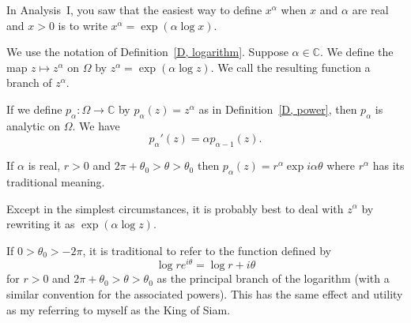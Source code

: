 In Analysis~I, you saw that the easiest way to
define $x^{\alpha}$ when $x$ and $\alpha$ are real
and $x>0$ is to write $x^{\alpha}=\exp(\alpha \log x)$.
\begin{definition}\label{D, power} 
We use the notation of
Definition~\ref{D, logarithm}. Suppose $\alpha\in{\mathbb C}$.
We define the map $z\mapsto z^{\alpha}$ on
$\Omega$ by $z^{\alpha}=\exp(\alpha\log z)$.
We call the resulting function a branch of $z^{\alpha}$.
\end{definition}
\begin{lemma} If we define $p_{\alpha}:\Omega\rightarrow{\mathbb C}$
by $p_{\alpha}(z)=z^{\alpha}$ as in Definition~\ref{D, power},
then $p_{\alpha}$ is analytic on $\Omega$. We have
\[p_{\alpha}'(z)=\alpha p_{\alpha-1}(z).\]

If $\alpha$ is real,
$r>0$ and $2\pi+\theta_{0}>\theta>\theta_{0}$ then
$p_{\alpha}(z)=r^{\alpha}\exp i\alpha\theta$
where $r^{\alpha}$ has its traditional meaning.
\end{lemma}
Except in the simplest circumstances, it is probably
best to deal with $z^{\alpha}$ by rewriting it
as $\exp(\alpha\log z)$.

If $0>\theta_{0}>-2\pi$, it is traditional to refer to
the function defined by
\[\log re^{i\theta}=\log r +i\theta\]
for $r>0$ and $2\pi+\theta_{0}>\theta>\theta_{0}$
as the principal branch of the logarithm
(with a similar convention for the associated powers).
This has the same effect and utility as my referring
to myself as the King of Siam.
